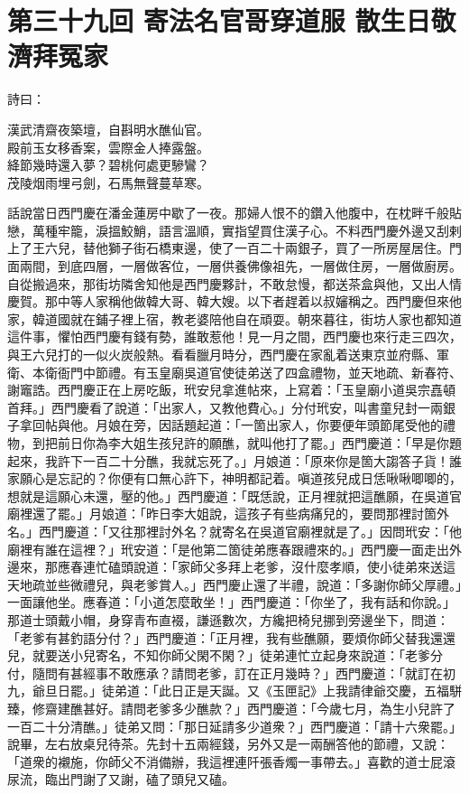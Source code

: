 
\chapter*{第三十九回 寄法名官哥穿道服 散生日敬濟拜冤家}


詩曰：

\begin{myquote}
漢武清齋夜築壇，自斟明水醮仙官。\\殿前玉女移香案，雲際金人捧露盤。\\絳節幾時還入夢？碧桃何處更驂鸞？\\茂陵烟雨埋弓劍，石馬無聲蔓草寒。
\end{myquote}

話說當日西門慶在潘金蓮房中歇了一夜。那婦人恨不的鑽入他腹中，在枕畔千般貼戀，萬種牢籠，淚搵鮫鮹，語言溫順，實指望買住漢子心。不料西門慶外邊又刮剌上了王六兒，替他獅子街石橋東邊，使了一百二十兩銀子，買了一所房屋居住。門面兩間，到底四層，一層做客位，一層供養佛像祖先，一層做住房，一層做廚房。自從搬過來，那街坊隣舍知他是西門慶夥計，不敢怠慢，都送茶盒與他，又出人情慶賀。那中等人家稱他做韓大哥、韓大嫂。以下者趕着以叔嬸稱之。西門慶但來他家，韓道國就在鋪子裡上宿，教老婆陪他自在頑耍。朝來暮往，街坊人家也都知道這件事，懼怕西門慶有錢有勢，誰敢惹他！見一月之間，西門慶也來行走三四次，與王六兒打的一似火炭般熱。看看臘月時分，西門慶在家亂着送東京並府縣、軍衛、本衛衙門中節禮。有玉皇廟吳道官使徒弟送了四盒禮物，並天地疏、新春符、謝竈誥。西門慶正在上房吃飯，玳安兒拿進帖來，上寫着：「玉皇廟小道吳宗嚞頓首拜。」西門慶看了說道：「出家人，又教他費心。」分付玳安，叫書童兒封一兩銀子拿回帖與他。月娘在旁，因話題起道：「一箇出家人，你要便年頭節尾受他的禮物，到把前日你為李大姐生孩兒許的願醮，就叫他打了罷。」西門慶道：「早是你題起來，我許下一百二十分醮，我就忘死了。」月娘道：「原來你是箇大謅答子貨！誰家願心是忘記的？你便有口無心許下，神明都記着。嗔道孩兒成日恁啾啾唧唧的，想就是這願心未還，壓的他。」{}西門慶道：「既恁說，正月裡就把這醮願，在吳道官廟裡還了罷。」月娘道：「昨日李大姐說，這孩子有些病痛兒的，要問那裡討箇外名。」西門慶道：「又往那裡討外名？就寄名在吳道官廟裡就是了。」因問玳安：「他廟裡有誰在這裡？」玳安道：「是他第二箇徒弟應春跟禮來的。」西門慶一面走出外邊來，那應春連忙磕頭說道：「家師父多拜上老爹，沒什麼孝順，使小徒弟來送這天地疏並些微禮兒，與老爹賞人。」西門慶止還了半禮，說道：「多謝你師父厚禮。」一面讓他坐。應春道：「小道怎麼敢坐！」西門慶道：「你坐了，我有話和你說。」那道士頭戴小帽，身穿青布直裰，謙遜數次，方纔把椅兒挪到旁邊坐下，問道：「老爹有甚釣語分付？」西門慶道：「正月裡，我有些醮願，要煩你師父替我還還兒，就要送小兒寄名，不知你師父閑不閑？」徒弟連忙立起身來說道：「老爹分付，隨問有甚經事不敢應承？請問老爹，訂在正月幾時？」西門慶道：「就訂在初九，爺旦日罷。」徒弟道：「此日正是天誕。又《玉匣記》上我請律爺交慶，五福駢臻，修齋建醮甚好。請問老爹多少醮款？」西門慶道：「今歲七月，為生小兒許了一百二十分清醮。」徒弟又問：「那日延請多少道衆？」西門慶道：「請十六衆罷。」說畢，左右放桌兒待茶。先封十五兩經錢，另外又是一兩酬答他的節禮，又說：「道衆的襯施，你師父不消備辦，我這裡連阡張香燭一事帶去。」喜歡的道士屁滾尿流，臨出門謝了又謝，磕了頭兒又磕。

